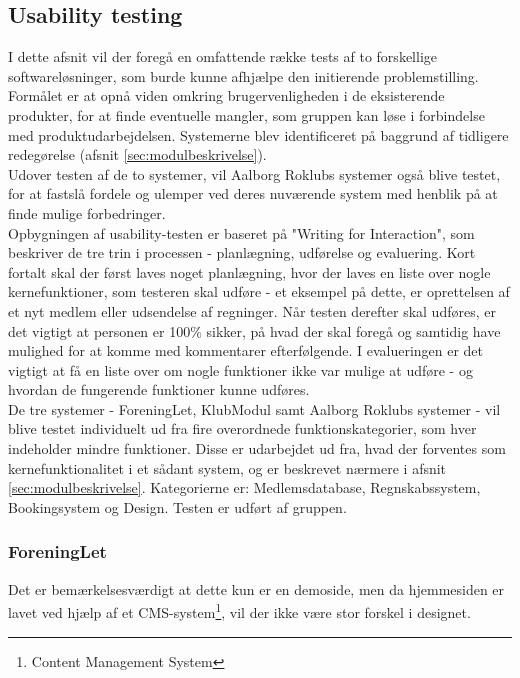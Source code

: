 \subsection{Usability testing}
\label{sec:Usability}

I dette afsnit vil der foregå en omfattende række tests af to forskellige softwareløsninger, som burde kunne afhjælpe den initierende problemstilling. Formålet er at opnå viden omkring brugervenligheden i de eksisterende produkter, for at finde eventuelle mangler, som gruppen kan løse i forbindelse med produktudarbejdelsen. Systemerne blev identificeret på baggrund af tidligere redegørelse (afsnit \ref{sec:modulbeskrivelse}).\\

Udover testen af de to systemer, vil Aalborg Roklubs systemer også blive testet, for at fastslå fordele og ulemper ved deres nuværende system med henblik på at finde mulige forbedringer.\\

Opbygningen af usability-testen er baseret på "Writing for Interaction"\mbox{}, som beskriver de tre trin i processen - planlægning, udførelse og evaluering. Kort fortalt skal der først laves noget planlægning, hvor der laves en liste over nogle kernefunktioner, som testeren skal udføre - et eksempel på dette, er oprettelsen af et nyt medlem eller udsendelse af regninger. Når testen derefter skal udføres, er det vigtigt at personen er 100\% sikker, på hvad der skal foregå og samtidig have mulighed for at komme med kommentarer efterfølgende. I evalueringen er det vigtigt at få en liste over om nogle funktioner ikke var mulige at udføre - og hvordan de fungerende funktioner kunne udføres. \cite{WritingForInteraction}\\

De tre systemer - ForeningLet, KlubModul samt Aalborg Roklubs systemer - vil blive testet individuelt ud fra fire overordnede funktionskategorier, som hver indeholder mindre funktioner. Disse er udarbejdet ud fra, hvad der forventes som kernefunktionalitet i et sådant system, og er beskrevet nærmere i afsnit \ref{sec:modulbeskrivelse}. Kategorierne er: Medlemsdatabase, Regnskabssystem, Bookingsystem og Design. Testen er udført af gruppen.

\subsubsection{ForeningLet}
Det er bemærkelsesværdigt at dette kun er en demoside, men da hjemmesiden er lavet ved hjælp af et CMS-system\footnote{Content Management System}, vil der ikke være stor forskel i designet.\\

